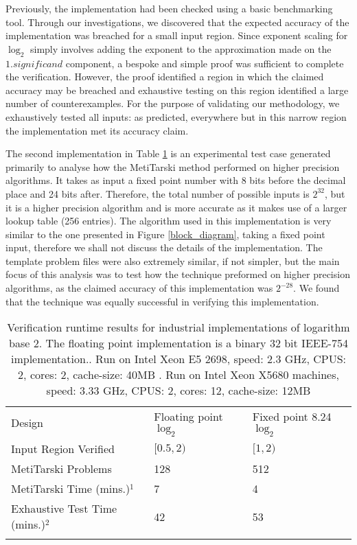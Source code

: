 \documentclass{fac}
\begin{document}
Previously, the implementation had been checked using a basic benchmarking tool. Through our investigations, we discovered that the expected accuracy of the implementation was breached for a small input region. Since exponent scaling for $\log_2$ simply involves adding the exponent to the approximation made on the $1.\textit{significand}$ component, a bespoke and simple proof was sufficient to complete the verification. However, the proof identified a region in which the claimed accuracy may be breached and exhaustive testing on this region identified a large number of counterexamples. For the purpose of validating our methodology, we exhaustively tested all inputs: as predicted, everywhere but in this narrow region the implementation met its accuracy claim.

The second implementation in Table \ref{result} is an experimental test case generated primarily to analyse how the MetiTarski method performed on higher precision algorithms. It takes as input a fixed point number with 8 bits before the decimal place and 24 bits after. Therefore, the total number of possible inputs is $2^{32}$, but it is a higher precision algorithm and is more accurate as it makes use of a larger lookup table (256 entries). The algorithm used in this implementation is very similar to the one presented in Figure \ref{block_diagram}, taking a fixed point input, therefore we shall not discuss the details of the implementation. The template problem files were also extremely similar, if not simpler, but the main focus of this analysis was to test how the technique preformed on higher precision algorithms, as the claimed accuracy of this implementation was $2^{-28}$. We found that the technique was equally successful in verifying this implementation. 

\begin{table}
\caption{Verification runtime results for industrial implementations of logarithm base 2. The floating point implementation is a binary 32 bit IEEE-754 implementation.. Run on Intel Xeon E5 2698, speed: 2.3 GHz, CPUS: 2, cores: 2, cache-size: 40MB
. Run on Intel Xeon X5680 machines, speed: 3.33 GHz, CPUS: 2, cores: 12, cache-size: 12MB}
\label{result}     
\begin{tabular}{lll}
\hline\noalign{\smallskip}
Design & Floating point $\log_2$ & Fixed point 8.24 $\log_2$    \\

\noalign{\smallskip}\hline\noalign{\smallskip}

 Input Region Verified& $[0.5,2)$ & $[1,2) $ \\ 
 MetiTarski Problems & 128 & 512 \\
 MetiTarski Time (mins.)$^1$ &  7 & 4 \\ 
 Exhaustive Test Time (mins.)$^2$ & 42 & 53 \\
\noalign{\smallskip}\hline
\end{tabular}
\end{table}
\end{document}
